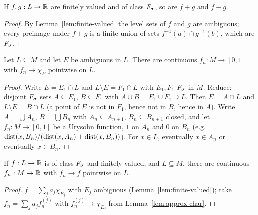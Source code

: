 \begin{lemma}\label{lem:finite-valued-ops}
If $f,g:L\to\mathbb{R}$ are finitely valued and of class $F_\sigma$, so are $f+g$ and $f-g$.
\end{lemma}
\begin{proof}
By Lemma~\ref{lem:finite-valued} the level sets of $f$ and $g$ are ambiguous; every preimage under $f\pm g$
is a finite union of sets $f^{-1}(a)\cap g^{-1}(b)$, which are $F_\sigma$.
\end{proof}

\begin{lemma}\label{lem:approx-char}
Let $L\subseteq M$ and let $E$ be ambiguous in $L$. There are continuous $f_n:M\to[0,1]$ with
$f_n\to\chi_E$ pointwise on $L$.
\end{lemma}
\begin{proof}
Write $E=E_1\cap L$ and $L\setminus E=F_1\cap L$ with $E_1,F_1$ $F_\sigma$ in $M$. Reduce: disjoint $F_\sigma$
sets $A\subseteq E_1$, $B\subseteq F_1$ with $A\cup B=E_1\cup F_1\supseteq L$. Then $E=A\cap L$ and
$L\setminus E=B\cap L$ (a point of $E$ is not in $F_1$, hence not in $B$, hence in $A$). Write
$A=\bigcup A_n$, $B=\bigcup B_n$ with $A_n\subseteq A_{n+1}$, $B_n\subseteq B_{n+1}$ closed, and let
$f_n:M\to[0,1]$ be a Urysohn function, $1$ on $A_n$ and $0$ on $B_n$ (e.g.\
$\operatorname{dist}(x,B_n)/(\operatorname{dist}(x,A_n)+\operatorname{dist}(x,B_n))$). For $x\in L$, eventually $x\in A_n$ or eventually
$x\in B_n$.
\end{proof}

\begin{lemma}[{\cite[Lemma 3]{Diss}}]\label{lem:approx-finite}
If $f:L\to\mathbb{R}$ is of class $F_\sigma$ and finitely valued, and $L\subseteq M$, there are continuous
$f_n:M\to\mathbb{R}$ with $f_n\to f$ pointwise on $L$.
\end{lemma}
\begin{proof}
$f=\sum_ja_j\chi_{E_j}$ with $E_j$ ambiguous (Lemma~\ref{lem:finite-valued}); take
$f_n=\sum_ja_jf^{(j)}_n$ with $f^{(j)}_n\to\chi_{E_j}$ from Lemma~\ref{lem:approx-char}.
\end{proof}

